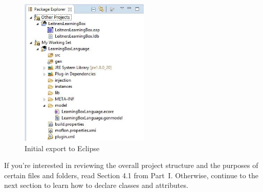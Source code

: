 \begin{stepbystep}
\clearpage

\vspace*{2cm}

\begin{figure}[htbp]
	\centering
  \includegraphics[width=0.55\textwidth]{../../org.moflon.doc.handbook.02_leitnersLearningBox/2_staticSemantics/1_newStart/nsVisImages/eclipse_visInitExport}
	\caption{Initial export to Eclipse}
	\label{eclipse:initExport}
\end{figure}

\vspace{1cm}

\item If you're interested in reviewing the overall project structure and the purposes of certain files and folders, read Section 4.1
from Part~I. Otherwise, continue to the next section to learn how to declare classes and attributes.

\end{stepbystep}
